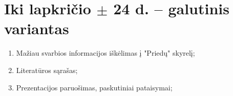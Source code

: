 \documentclass[a4paper]{article}
\begin{document}
\section{{\color{red} Iki lapkričio $\pm$ 24 d.} -- galutinis variantas}

\begin{enumerate}
\item {Mažiau svarbios informacijos iškėlimas į "Priedų" skyrelį;}
\item {Literatūros sąrašas;}
\item {Prezentacijos paruošimas, paskutiniai pataisymai;}

\end{enumerate}
\end{document}
